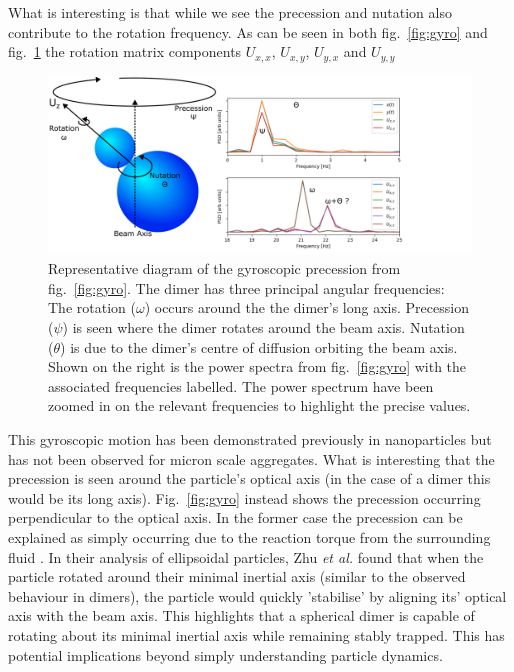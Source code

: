 What is interesting is that while we see the precession and 
nutation also contribute to the rotation frequency. As can be 
seen in both fig.~\ref{fig:gyro} and fig.~\ref{fig:gyro_diagram}
the rotation matrix components $U_{x,x}$, $U_{x,y}$, $U_{y,x}$
and $U_{y,y}$
 
\begin{figure}
	\hspace{-2.3cm}
	\includegraphics[width=1.2\linewidth]{gyroscopic_diagram.pdf}
	\caption{Representative diagram of the gyroscopic precession 
	from fig.~\ref{fig:gyro}. The dimer has three principal angular
	frequencies: The rotation ($\omega$) occurs around the 
	the dimer's long axis. Precession ($\psi$) is seen where the dimer 
	rotates around the beam axis. Nutation ($\theta$) is due to the dimer's 
	centre of diffusion orbiting the beam axis. Shown on the right
	is the power spectra from fig.~\ref{fig:gyro} with the associated 
	frequencies labelled. The power spectrum have been zoomed in on
	the relevant frequencies to highlight the precise values.}
	\label{fig:gyro_diagram}
\end{figure}

This gyroscopic motion has been demonstrated previously in 
nanoparticles \cite{Zhu2021, Rashid2018, Hoang2016, Kuhn2016} 
but has not been observed for micron scale aggregates. What
is interesting that the precession is seen around the particle's
optical axis (in the case of a dimer this would be its long 
axis). Fig.~\ref{fig:gyro} instead shows the precession 
occurring perpendicular to the optical axis. In the former 
case the precession can be explained as simply occurring due 
to the reaction torque from the surrounding fluid \cite{Zhu2021}.
In their analysis of ellipsoidal particles, Zhu \textit{et al.}
found that when the particle rotated around their minimal inertial 
axis (similar to the observed behaviour in dimers), the particle 
would quickly 'stabilise' by aligning its' optical axis with the 
beam axis. This highlights that a spherical dimer is capable of 
rotating about its minimal inertial axis while remaining stably
trapped. This has potential implications beyond simply 
understanding particle dynamics. 

